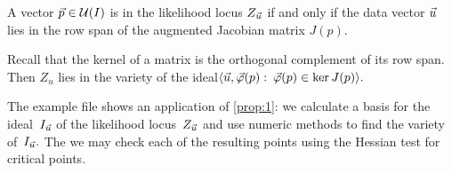 \documentclass{article}
\begin{document}
  \begin{proposition}\label{prop:1}
    A vector \(\vec p \in \mathcal{U}(I)\) is in the likelihood locus \(Z_{\vec u}\) if and only if the data vector \(\vec u\) lies in the row span of the augmented Jacobian matrix \(J(p).\)
  \end{proposition}

  Recall that the kernel of a matrix is the orthogonal complement of its row span. Then \(Z_u\) lies in the variety of the ideal\(\langle \vec u,\vec{\varphi}(p):\:\vec{\varphi}(p)\in \ker J(p)\rangle.\)

  The example file  shows an application of \ref{prop:1}: we calculate a basis for the ideal~\(I_{\vec u}\) of the likelihood locus~\(Z_{\vec u}\) and use numeric methods to find the variety of~\(I_{\vec u}.\) The we may check each of the resulting points using the Hessian test for critical points.
\end{document}
